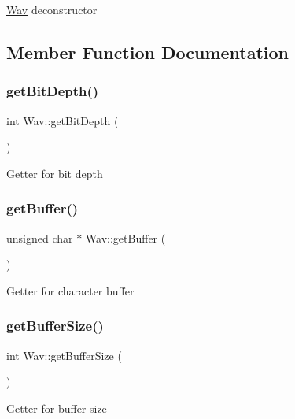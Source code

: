 \hyperlink{classWav}{Wav} deconstructor 

\subsection{Member Function Documentation}
\mbox{\label{classWav_afbd5588a3621503ee028fbec055fd075}} 
\subsubsection{\texorpdfstring{get\+Bit\+Depth()}{getBitDepth()}}
{\footnotesize\ttfamily int Wav\+::get\+Bit\+Depth (\begin{DoxyParamCaption}{ }\end{DoxyParamCaption})}

Getter for bit depth \mbox{\label{classWav_a2daf07a90ed34789e3a1874973d9bd36}} 
\subsubsection{\texorpdfstring{get\+Buffer()}{getBuffer()}}
{\footnotesize\ttfamily unsigned char $\ast$ Wav\+::get\+Buffer (\begin{DoxyParamCaption}{ }\end{DoxyParamCaption})}

Getter for character buffer \mbox{\label{classWav_a11de10cb698ea0ea08f3a28580f21b39}} 
\subsubsection{\texorpdfstring{get\+Buffer\+Size()}{getBufferSize()}}
{\footnotesize\ttfamily int Wav\+::get\+Buffer\+Size (\begin{DoxyParamCaption}{ }\end{DoxyParamCaption})}

Getter for buffer size \mbox{\label{classWav_abfc3c1b6afed8bfc43a17cbd76f8a809}} 
